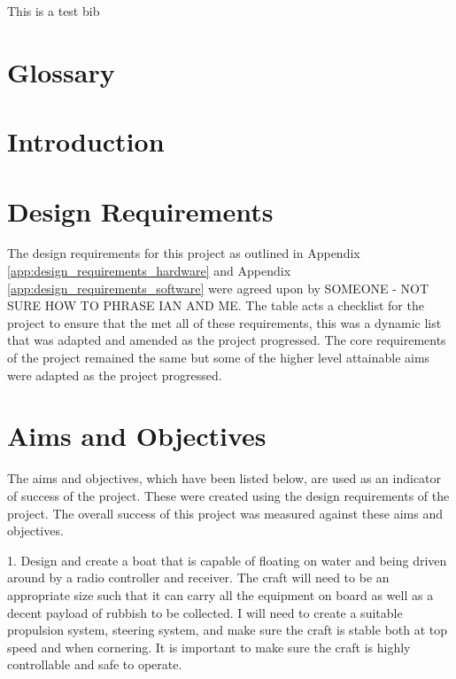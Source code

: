 \documentclass [11pt]{article}
\begin{document}
This is a test bib \cite{agile_development}		
\newpage			
{}
\setcounter{page}{1}
\tableofcontents 
\newpage

\listoffigures
\listoftables

\newpage

\section{Glossary}
\newpage
\section{Introduction}



\section{Design Requirements}

The design requirements for this project as outlined in Appendix \ref{app:design_requirements_hardware} and Appendix \ref{app:design_requirements_software} were agreed upon by {SOMEONE - NOT SURE HOW TO PHRASE IAN AND ME}. The table acts a checklist for the project to ensure that the met all of these requirements, this was a dynamic list that was adapted and amended as the project progressed. The core requirements of the project remained the same but some of the higher level attainable aims were adapted as the project progressed. 

\section{Aims and Objectives}

The aims and objectives, which have been listed below, are used as an indicator of success of the project. These were created using the design requirements of the project. The overall success of this project was measured against these aims and objectives. 

1.	Design and create a boat that is capable of floating on water and being driven around by a radio controller and receiver. The craft will need to be an appropriate size such that it can carry all the equipment on board as well as a decent payload of rubbish to be collected. I will need to create a suitable propulsion system, steering system, and make sure the craft is stable both at top speed and when cornering. It is important to make sure the craft is highly controllable and safe to operate. 
\end{document}
